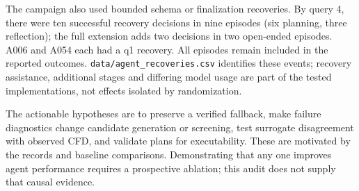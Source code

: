 The campaign also used bounded schema or finalization recoveries. By query 4,
there were ten successful recovery decisions in nine episodes (six planning,
three reflection); the full extension adds two decisions in two open-ended
episodes. A006 and A054 each had a q1 recovery. All episodes remain included
in the reported outcomes. \texttt{data/agent\_recoveries.csv} identifies these
events; recovery assistance, additional stages and differing model usage are
part of the tested implementations, not effects isolated by randomization.

The actionable hypotheses are to preserve a verified fallback, make failure
diagnostics change candidate generation or screening, test surrogate
disagreement with observed CFD, and validate plans for executability. These
are motivated by the records and baseline comparisons. Demonstrating that any
one improves agent performance requires a prospective ablation; this audit
does not supply that causal evidence.

